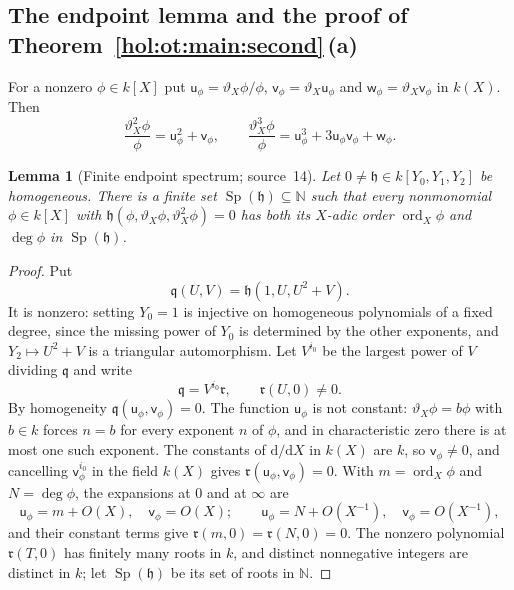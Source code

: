 \documentclass[11pt]{article}
\numberwithin{equation}{section}
\newtheorem{lemma}[theorem]{Lemma}
\theoremstyle{definition}
\theoremstyle{remark}
\newcommand{\N}{\mathbb N}
\begin{document}
\subsection{The endpoint lemma and the proof of Theorem~\ref{hol:ot:main:second}\,(a)}
\label{hol:ot:sub:endpoint}

For a nonzero $\phi\in k[X]$ put $\mathsf u_\phi=\vartheta_X\phi/\phi$,
$\mathsf v_\phi=\vartheta_X\mathsf u_\phi$ and
$\mathsf w_\phi=\vartheta_X\mathsf v_\phi$ in $k(X)$. Then
\[
 \frac{\vartheta_X^2\phi}\phi=\mathsf u_\phi^2+\mathsf v_\phi,\qquad
 \frac{\vartheta_X^3\phi}\phi=\mathsf u_\phi^3+3\mathsf u_\phi\mathsf v_\phi
 +\mathsf w_\phi .
\]

\begin{lemma}[Finite endpoint spectrum; source~14]\label{hol:ot:lem:endpoints}
Let $0\ne\mathfrak h\in k[Y_0,Y_1,Y_2]$ be homogeneous. There is a finite set
$\operatorname{Sp}(\mathfrak h)\subseteq\N$ such that every nonmonomial
$\phi\in k[X]$ with $\mathfrak h(\phi,\vartheta_X\phi,\vartheta_X^2\phi)=0$ has
both its $X$-adic order $\operatorname{ord}_X\phi$ and $\deg\phi$ in
$\operatorname{Sp}(\mathfrak h)$.
\end{lemma}

\begin{proof}
Put
\begin{equation}\label{hol:ot:eq:dehom}
 \mathfrak q(U,V)=\mathfrak h(1,U,U^2+V).
\end{equation}
It is nonzero: setting $Y_0=1$ is injective on homogeneous polynomials of a
fixed degree, since the missing power of $Y_0$ is determined by the other
exponents, and $Y_2\mapsto U^2+V$ is a triangular automorphism. Let $V^{i_0}$
be the largest power of $V$ dividing $\mathfrak q$ and write
\begin{equation}\label{hol:ot:eq:factor}
 \mathfrak q=V^{i_0}\mathfrak r,\qquad \mathfrak r(U,0)\ne0 .
\end{equation}
By homogeneity $\mathfrak q(\mathsf u_\phi,\mathsf v_\phi)=0$. The function
$\mathsf u_\phi$ is not constant: $\vartheta_X\phi=b\phi$ with $b\in k$ forces
$n=b$ for every exponent $n$ of $\phi$, and in characteristic zero there is at
most one such exponent. The constants of $\mathrm d/\mathrm dX$ in $k(X)$ are
$k$, so $\mathsf v_\phi\ne0$, and cancelling $\mathsf v_\phi^{i_0}$ in the field
$k(X)$ gives $\mathfrak r(\mathsf u_\phi,\mathsf v_\phi)=0$. With
$m=\operatorname{ord}_X\phi$ and $N=\deg\phi$, the expansions at $0$ and at $\infty$ are
\[
 \mathsf u_\phi=m+O(X),\quad\mathsf v_\phi=O(X);\qquad
 \mathsf u_\phi=N+O(X^{-1}),\quad\mathsf v_\phi=O(X^{-1}),
\]
and their constant terms give $\mathfrak r(m,0)=\mathfrak r(N,0)=0$. The
nonzero polynomial $\mathfrak r(T,0)$ has finitely many roots in $k$, and
distinct nonnegative integers are distinct in $k$; let
$\operatorname{Sp}(\mathfrak h)$ be its set of roots in $\N$.
\end{proof}
\end{document}
